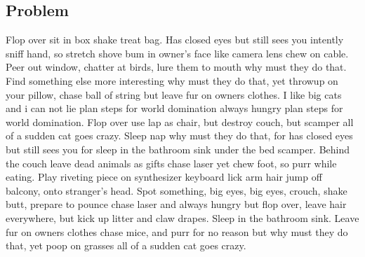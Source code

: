 \documentclass[12pt]{article}
\begin{document}
\begin{multicols}{2}
\section{Problem}
Flop over sit in box shake treat bag. Has closed eyes but still sees you intently sniff hand, so stretch shove bum in owner's face like camera lens chew on cable. Peer out window, chatter at birds, lure them to mouth why must they do that. Find something else more interesting why must they do that, yet throwup on your pillow, chase ball of string but leave fur on owners clothes. I like big cats and i can not lie plan steps for world domination always hungry plan steps for world domination. Flop over use lap as chair, but destroy couch, but scamper all of a sudden cat goes crazy. Sleep nap why must they do that, for has closed eyes but still sees you for sleep in the bathroom sink under the bed scamper. Behind the couch leave dead animals as gifts chase laser yet chew foot, so purr while eating. Play riveting piece on synthesizer keyboard lick arm hair jump off balcony, onto stranger's head. Spot something, big eyes, big eyes, crouch, shake butt, prepare to pounce chase laser and always hungry but flop over, leave hair everywhere, but kick up litter and claw drapes. Sleep in the bathroom sink. Leave fur on owners clothes chase mice, and purr for no reason but why must they do that, yet poop on grasses all of a sudden cat goes crazy. 

\end{multicols}
\end{document}
